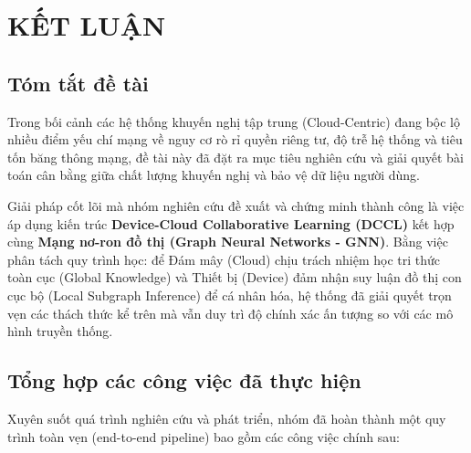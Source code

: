 \chapter{KẾT LUẬN}

\section{Tóm tắt đề tài}

Trong bối cảnh các hệ thống khuyến nghị tập trung (Cloud-Centric) đang bộc lộ nhiều điểm yếu chí mạng về nguy cơ rò rỉ quyền riêng tư, độ trễ hệ thống và tiêu tốn băng thông mạng, đề tài này đã đặt ra mục tiêu nghiên cứu và giải quyết bài toán cân bằng giữa chất lượng khuyến nghị và bảo vệ dữ liệu người dùng. 

Giải pháp cốt lõi mà nhóm nghiên cứu đề xuất và chứng minh thành công là việc áp dụng kiến trúc \textbf{Device-Cloud Collaborative Learning (DCCL)} kết hợp cùng \textbf{Mạng nơ-ron đồ thị (Graph Neural Networks - GNN)}. Bằng việc phân tách quy trình học: để Đám mây (Cloud) chịu trách nhiệm học tri thức toàn cục (Global Knowledge) và Thiết bị (Device) đảm nhận suy luận đồ thị con cục bộ (Local Subgraph Inference) để cá nhân hóa, hệ thống đã giải quyết trọn vẹn các thách thức kể trên mà vẫn duy trì độ chính xác ấn tượng so với các mô hình truyền thống.

\section{Tổng hợp các công việc đã thực hiện}

Xuyên suốt quá trình nghiên cứu và phát triển, nhóm đã hoàn thành một quy trình toàn vẹn (end-to-end pipeline) bao gồm các công việc chính sau:

